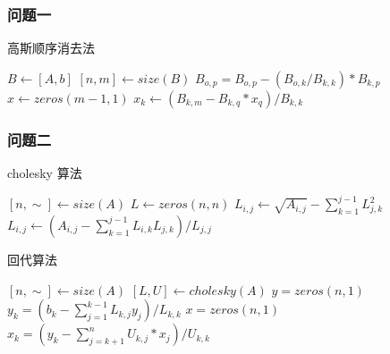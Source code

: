 \subsubsection{问题一}

\begin{breakablealgorithm}
    \caption{高斯顺序消去法}
    \begin{algorithmic}[1]
        \STATE $B \leftarrow [A, b]$ 
        \STATE $[n, m] \leftarrow size(B)$ 
        \STATE $B_{o, p} = B_{o, p} - (B_{o, k} / B_{k, k}) * B_{k, p}$
        \ENDFOR
        \ENDFOR
        \ENDFOR
        \STATE $x \leftarrow zeros(m-1, 1)$ 
        \STATE $x_k \leftarrow (B_{k, m} - B_{k, q} * x_q ) / B_{k, k}$
        \ENDFOR
        \ENDFOR
    \end{algorithmic}
\end{breakablealgorithm}

\subsubsection{问题二}

\begin{breakablealgorithm}
    \caption{cholesky 算法}
    \begin{algorithmic}[1]
        \label{alg:cholesky}
        \STATE $[n, \sim] \leftarrow size(A)$ 
        \STATE $L \leftarrow zeros(n, n)$ 
        \STATE $L_{i, j} \leftarrow \sqrt{A_{i, j}} - \sum_{k=1}^{j-1}L_{j, k}^2$
        \ELSE
        \STATE $L_{i, j} \leftarrow (A_{i, j} - \sum_{k=1}^{j-1}L_{i, k}L_{j, k}) / L_{j, j}$
        \ENDIF
        \ENDFOR
        \ENDFOR
    \end{algorithmic}
\end{breakablealgorithm}

\begin{breakablealgorithm}
    \caption{回代算法}
    \begin{algorithmic}[1]
        \STATE $[n, \sim] \leftarrow size(A)$ 
        \STATE $[L, U] \leftarrow cholesky(A)$ 
        \STATE $y = zeros(n, 1)$ 
        \STATE $y_k = (b_k - \sum_{j = 1}^{k - 1} L_{k, j}y_j) / L_{k, k}$
        \ENDFOR
        \STATE $x = zeros(n, 1)$ 
        \STATE $x_k = (y_k - \sum_{j=k + 1}^n U_{k, j} * x_j) / U_{k, k}$
        \ENDFOR
    \end{algorithmic}
\end{breakablealgorithm}

